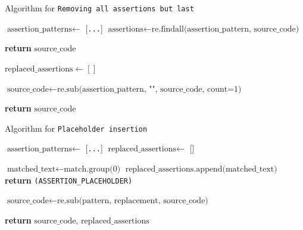     \begin{algorithm}
    \caption{Algorithm for \texttt{Removing all assertions but last}}
    \label{algorithm_remove_assertion}
    \begin{algorithmic}[1]
        \State $\text{assertion\_patterns} \gets$ [\texttt{...}] 
        \State $\text{assertions} \gets \text{re.findall(assertion\_pattern, source\_code)}$
    
            \State \textbf{return} $\text{source\_code}$
        \EndIf
    
        \State $\text{replaced\_assertions} \gets []$
    
            \State $\text{source\_code} \gets \text{re.sub(assertion\_pattern, "", source\_code, count=1)}$
        \EndFor
    
        \State \textbf{return} $\text{source\_code}$
    \EndFunction
    \end{algorithmic}
    \end{algorithm}

    \begin{algorithm}
    \caption{Algorithm for \texttt{Placeholder insertion}}
    \label{algorithm_placeholder_insertion}
    \begin{algorithmic}[1]
        \State $\text{assertion\_patterns} \gets$ [\texttt{...}] 
        \State $\text{replaced\_assertions} \gets$ [] 
    
                \State $\text{matched\_text} \gets \text{match.group(0)}$
                \State $\text{replaced\_assertions.append(matched\_text)}$
                \State \textbf{return} \texttt{(ASSERTION\_PLACEHOLDER)}
            \EndFunction
    
            \State $\text{source\_code} \gets \text{re.sub(pattern, replacement, source\_code)}$
        \EndFor
    
        \State \textbf{return} $\text{source\_code, replaced\_assertions}$
    \EndFunction
    \end{algorithmic}
    \end{algorithm}
        
